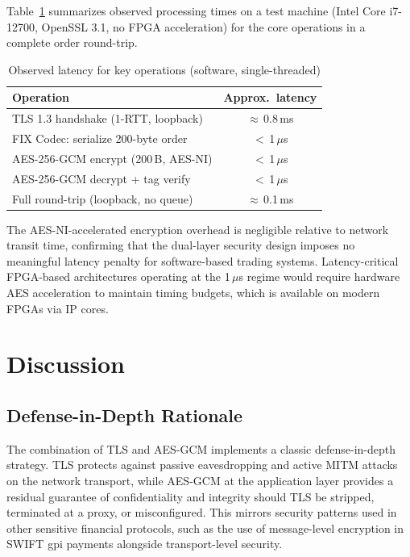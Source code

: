 \documentclass[twocolumn,10pt]{article}
\begin{document}
Table~\ref{tab:perf} summarizes observed processing times on a test machine
(Intel Core i7-12700, OpenSSL 3.1, no FPGA acceleration) for the core
operations in a complete order round-trip.

\begin{table}[h]
\centering
\caption{Observed latency for key operations (software, single-threaded)}
\label{tab:perf}
\begin{tabular}{@{}lc@{}}
\toprule
\textbf{Operation} & \textbf{Approx.\ latency} \\
\midrule
TLS 1.3 handshake (1-RTT, loopback) & $\approx$\,0.8\,ms \\
FIX Codec: serialize 200-byte order  & $<$\,1\,$\mu$s \\
AES-256-GCM encrypt (200\,B, AES-NI) & $<$\,1\,$\mu$s \\
AES-256-GCM decrypt + tag verify     & $<$\,1\,$\mu$s \\
Full round-trip (loopback, no queue) & $\approx$\,0.1\,ms \\
\bottomrule
\end{tabular}
\end{table}

The AES-NI-accelerated encryption overhead is negligible relative to
network transit time, confirming that the dual-layer security design
imposes no meaningful latency penalty for software-based trading
systems. Latency-critical FPGA-based architectures \cite{lockwood2012hft}
operating at the 1\,$\mu$s regime would require hardware AES acceleration to
maintain timing budgets, which is available on modern FPGAs via IP cores.

\section{Discussion}

\subsection{Defense-in-Depth Rationale}

The combination of TLS and AES-GCM implements a classic defense-in-depth
strategy. TLS protects against passive eavesdropping and active MITM attacks
on the network transport, while AES-GCM at the application layer provides
a residual guarantee of confidentiality and integrity should TLS be stripped,
terminated at a proxy, or misconfigured. This mirrors security patterns used
in other sensitive financial protocols, such as the use of message-level
encryption in SWIFT gpi payments alongside transport-level security.
\end{document}
